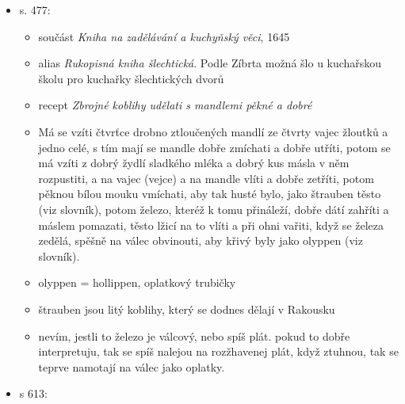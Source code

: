 \begin{itemize}
\begin{itemize}
    \begin{itemize}
    \tightlist
    \item
      cituje trojjazyčný slovník Hadriani Junii Nomenclator omnium rerum
      propria nomina tribus linguis explicata continens, Pragae, 1686,
    \item
      ale podle Zíbrta je to špatnej název, původně se měl jmenovat
      Vocabolarium trilingue.
    \item
      každopádně je tam seznam jídel s překlady a mezi nima vaječník
      (Spisskuchen) (zajímavý, že ne Spiesskuchen)
    \item
      \href{https://www.digitale-sammlungen.de/view/bsb11105115?page=42\%2C43}{digitalizovanej
      originál}
    \item
      obelum = wagečnjk = spisskuchen
    \end{itemize}
  \item
    s. 477:

    \begin{itemize}
    \tightlist
    \item
      součást \emph{Kniha na zadělávání a kuchyňský věci}, 1645
    \item
      alias \emph{Rukopisná kniha šlechtická}. Podle Zíbrta možná šlo u
      kuchařskou školu pro kuchařky šlechtických dvorů
    \item
      recept \emph{Zbrojné koblihy udělati s mandlemi pěkné a dobré}
    \item
      Má se vzíti čtvrťce drobno ztloučených mandlí ze čtvrty vajec
      žloutků a jedno celé, s tím mají se mandle dobře zmíchati a dobře
      utříti, potom se má vzíti z dobrý žydlí sladkého mléka a dobrý kus
      másla v něm rozpustiti, a na vajec (vejce) a na mandle vlíti a
      dobře zetříti, potom pěknou bílou mouku vmíchati, aby tak husté
      bylo, jako štrauben těsto (viz slovník), potom železo, kteréž k
      tomu přináleží, dobře dátí zahříti a máslem pomazati, těsto lžicí
      na to vlíti a při ohni vařiti, když se železa zedělá, spěšně na
      válec obvinouti, aby křivý byly jako olyppen (viz slovník).
    \item
      olyppen = hollippen, oplatkový trubičky
    \item
      štrauben jsou litý koblihy, který se dodnes dělají v Rakousku
    \item
      nevím, jestli to železo je válcový, nebo spíš plát. pokud to dobře
      interpretuju, tak se spíš nalejou na rozžhavenej plát, když
      ztuhnou, tak se teprve namotají na válec jako oplatky.
    \end{itemize}
  \item
    s 613:


\end{itemize}
\end{itemize}

